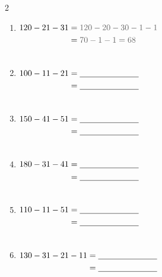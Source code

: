 \documentclass{article}
\begin{document}
\begin{multicols}{2}
\begin{enumerate}[label=\textbf{\arabic*.}, itemsep=1.8em, leftmargin=2em]
  \item $\begin{aligned}[t] 120 - 21 - 31 &= {\color{subtext}120 - 20 - 30 - 1 - 1} \\ &= {\color{subtext}70 - 1 - 1 = 68} \\ &\vphantom{70 - 1 - 1 = 68}\end{aligned}$
  \item $\begin{aligned}[t] 100 - 11 - 21 &= \underline{\hspace{2.5cm}} \\ &= \underline{\hspace{2.5cm}} \\ &\vphantom{70 - 1 - 1 = 68}\end{aligned}$
  \item $\begin{aligned}[t] 150 - 41 - 51 &= \underline{\hspace{2.5cm}} \\ &= \underline{\hspace{2.5cm}} \\ &\vphantom{70 - 1 - 1 = 68}\end{aligned}$
  \item $\begin{aligned}[t] 180 - 31 - 41 &= \underline{\hspace{2.5cm}} \\ &= \underline{\hspace{2.5cm}} \\ &\vphantom{70 - 1 - 1 = 68}\end{aligned}$
  \item $\begin{aligned}[t] 110 - 11 - 51 &= \underline{\hspace{2.5cm}} \\ &= \underline{\hspace{2.5cm}} \\ &\vphantom{70 - 1 - 1 = 68}\end{aligned}$
  \item $\begin{aligned}[t] 130 - 31 - 21 - 11 &= \underline{\hspace{2.5cm}} \\ &= \underline{\hspace{2.5cm}} \\ &\vphantom{70 - 1 - 1 = 68}\end{aligned}$

\end{enumerate}
\end{multicols}
\end{document}

